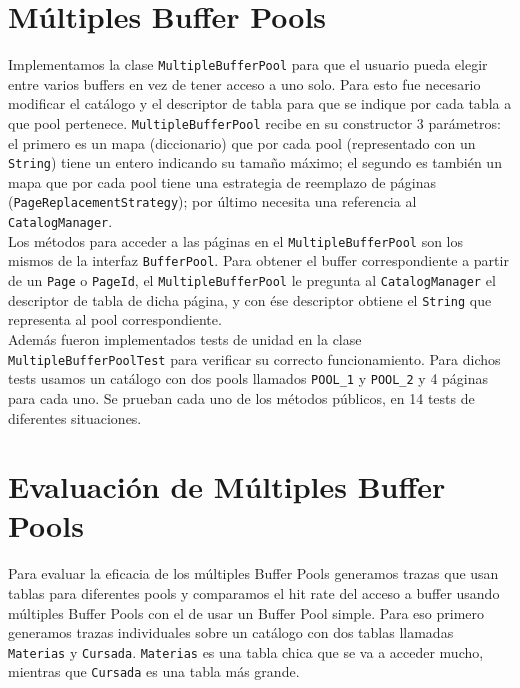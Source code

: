 \documentclass[a4paper,10pt]{article}
\begin{document}
\section{Múltiples Buffer Pools}
Implementamos la clase \texttt{MultipleBufferPool} para que el usuario pueda elegir entre varios buffers en vez de tener acceso a uno solo. Para esto fue necesario modificar el catálogo y el descriptor de tabla para que se indique por cada tabla a que pool pertenece. \texttt{MultipleBufferPool} recibe en su constructor 3 parámetros: el primero es un mapa (diccionario) que por cada pool (representado con un \texttt{String}) tiene un entero indicando su tamaño máximo; el segundo es también un mapa que por cada pool tiene una estrategia de reemplazo de páginas (\texttt{PageReplacementStrategy}); por último necesita una referencia al \texttt{CatalogManager}.\\

Los métodos para acceder a las páginas en el \texttt{MultipleBufferPool} son los mismos de la interfaz \texttt{BufferPool}. Para obtener el buffer correspondiente a partir de un \texttt{Page} o \texttt{PageId}, el \texttt{MultipleBufferPool} le pregunta al \texttt{CatalogManager} el descriptor de tabla de dicha página, y con ése descriptor obtiene el \texttt{String} que representa al pool correspondiente.\\

Además fueron implementados tests de unidad en la clase \texttt{MultipleBufferPoolTest} para verificar su correcto funcionamiento. Para dichos tests usamos un catálogo con dos pools llamados \texttt{POOL\_1} y \texttt{POOL\_2} y 4 páginas para cada uno. Se prueban cada uno de los métodos públicos, en 14 tests de diferentes situaciones.

\newpage

\section{Evaluación de Múltiples Buffer Pools}

Para evaluar la eficacia de los m\'ultiples Buffer Pools generamos trazas que usan tablas para diferentes pools y comparamos el hit rate del acceso a buffer usando m\'ultiples Buffer Pools con el de usar un Buffer Pool simple. Para eso primero generamos trazas individuales sobre un cat\'alogo con dos tablas llamadas \texttt{Materias} y \texttt{Cursada}. \texttt{Materias} es una tabla chica que se va a acceder mucho, mientras que \texttt{Cursada} es una tabla m\'as grande. \\
\end{document}
